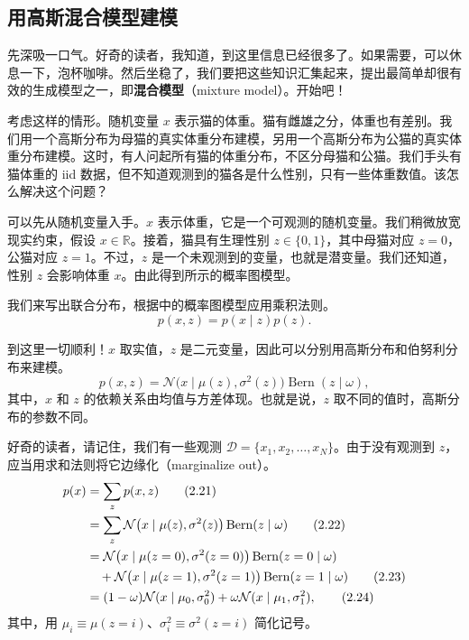 \subsection{用高斯混合模型建模}
先深吸一口气。好奇的读者，我知道，到这里信息已经很多了。如果需要，可以休息一下，泡杯咖啡。然后坐稳了，我们要把这些知识汇集起来，提出最简单却很有效的生成模型之一，即\textbf{混合模型}（mixture model）。开始吧！


考虑这样的情形。随机变量 $x$ 表示猫的体重。猫有雌雄之分，体重也有差别。我们用一个高斯分布为母猫的真实体重分布建模，另用一个高斯分布为公猫的真实体重分布建模。这时，有人问起所有猫的体重分布，不区分母猫和公猫。我们手头有猫体重的 iid 数据，但不知道观测到的猫各是什么性别，只有一些体重数值。该怎么解决这个问题？

可以先从随机变量入手。$x$ 表示体重，它是一个可观测的随机变量。我们稍微放宽现实约束，假设 $x\in\mathbb{R}$。接着，猫具有生理性别 $z\in\{0,1\}$，其中母猫对应 $z=0$，公猫对应 $z=1$。不过，$z$ 是一个未观测到的变量，也就是潜变量。我们还知道，性别 $z$ 会影响体重 $x$。由此得到所示的概率图模型。

我们来写出联合分布，根据中的概率图模型应用乘积法则。
\begin{equation}
p(x,z)=p(x\mid z)p(z).
\tag{2.19}\label{eq:02-19}
\end{equation}

到这里一切顺利！$x$ 取实值，$z$ 是二元变量，因此可以分别用高斯分布和伯努利分布来建模。
\begin{equation}
p(x,z)=\mathcal{N}\bigl(x\mid\mu(z),\sigma^2(z)\bigr)\operatorname{Bern}(z\mid\omega),
\tag{2.20}\label{eq:02-20}
\end{equation}
其中，$x$ 和 $z$ 的依赖关系由均值与方差体现。也就是说，$z$ 取不同的值时，高斯分布的参数不同。

好奇的读者，请记住，我们有一些观测 $\mathcal{D}=\{x_1,x_2,\ldots,x_N\}$。由于没有观测到 $z$，应当用求和法则将它边缘化（marginalize out）。
\begin{align}
p(x)&=\sum_z p(x,z) \tag{2.21}\label{eq:02-21}\\
 &=\sum_z\mathcal{N}\bigl(x\mid\mu(z),\sigma^2(z)\bigr)
          \operatorname{Bern}(z\mid\omega) \tag{2.22}\label{eq:02-22}\\
 &=\mathcal{N}\bigl(x\mid\mu(z=0),\sigma^2(z=0)\bigr)
          \operatorname{Bern}(z=0\mid\omega)\notag\\
 &\quad+\mathcal{N}\bigl(x\mid\mu(z=1),\sigma^2(z=1)\bigr)
          \operatorname{Bern}(z=1\mid\omega) \tag{2.23}\label{eq:02-23}\\
 &=(1-\omega)\mathcal{N}(x\mid\mu_0,\sigma_0^2)
          +\omega\mathcal{N}(x\mid\mu_1,\sigma_1^2), \tag{2.24}\label{eq:02-24}
\end{align}
其中，用 $\mu_i\equiv\mu(z=i)$、$\sigma_i^2\equiv\sigma^2(z=i)$ 简化记号。

